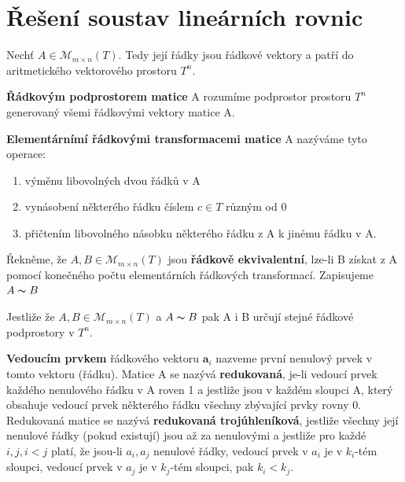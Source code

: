 \section{Řešení soustav lineárních rovnic}
Nechť $A \in \mathscr{M}_{m \times n}(T)$. Tedy její řádky jsou řádkové vektory a patří do aritmetického vektorového prostoru $T^n$.

\begin{definition}
	\textbf{Řádkovým podprostorem matice} A rozumíme podprostor prostoru $T^n$ generovaný všemi řádkovými vektory matice A.
\end{definition}

\begin{definition}
	\textbf{Elementárnímí řádkovými transformacemi matice} A nazýváme tyto operace:
	\begin{enumerate}
		\item výměnu libovolných dvou řádků v A
		\item vynásobení některého řádku číslem $c \in T$ různým od 0
		\item přičtením libovolného násobku některého řádku z A k jinému řádku v A.
	\end{enumerate}
\end{definition}

\begin{definition}
	Řekněme, že $A,B \in \mathscr{M}_{m \times n}(T)$ jsou \textbf{řádkově ekvivalentní}, lze-li B získat z A pomocí konečného počtu elementárních řádkových transformací. Zapisujeme $A \thicksim B$
\end{definition}

\begin{sentence}
	Jestliže že $A,B \in \mathscr{M}_{m \times n}(T)$  a $A \thicksim B$ pak A i B určují stejné řádkové podprostory v $T^n$.
\end{sentence}

\begin{definition}
	\textbf{Vedoucím prvkem} řádkového vektoru $\textbf{a}_i$ nazveme první nenulový prvek v tomto vektoru (řádku). Matice A se nazývá \textbf{redukovaná}, je-li vedoucí prvek každého nenulového řádku v A roven 1 a jestliže jsou v každém sloupci A, který obsahuje vedoucí prvek některého řádku všechny zbývající prvky rovny 0. Redukovaná matice se nazývá \textbf{redukovaná trojúhleníková}, jestliže všechny její nenulové řádky (pokud existují) jsou až za nenulovými a jestliže pro každé $i,j, i < j$ platí, že jsou-li $a_i,a_j$ nenulové řádky, vedoucí prvek v $a_i$ je v $k_i$-tém sloupci, vedoucí prvek v $a_j$ je v $k_j$-tém sloupci, pak $k_i < k_j$. 
\end{definition}

